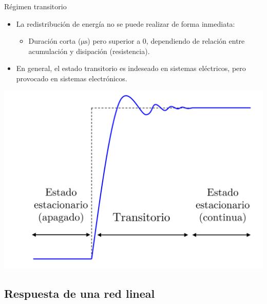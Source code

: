 \documentclass[aspectratio=169, usenames,svgnames,dvipsnames]{beamer}
\begin{document}
\begin{frame}[label={sec:orgc6de5df}]{Régimen transitorio}
\begin{itemize}
\item La redistribución de energía \alert{no} se puede realizar de forma \alert{inmediata}:
\begin{itemize}
\item \alert{Duración corta} (\(\si{\micro\second}\)) pero superior a 0, dependiendo de \alert{relación entre acumulación y disipación} (resistencia).
\end{itemize}
\item En general, el estado transitorio es indeseado en sistemas eléctricos, pero provocado en sistemas electrónicos.
\end{itemize}

\begin{center}
\includegraphics[height=0.55\textheight]{../figs/ej_transitorio_DC.png}
\end{center}
\end{frame}
\subsection{Respuesta de una red lineal}
\label{sec:org8590a00}
\end{document}
